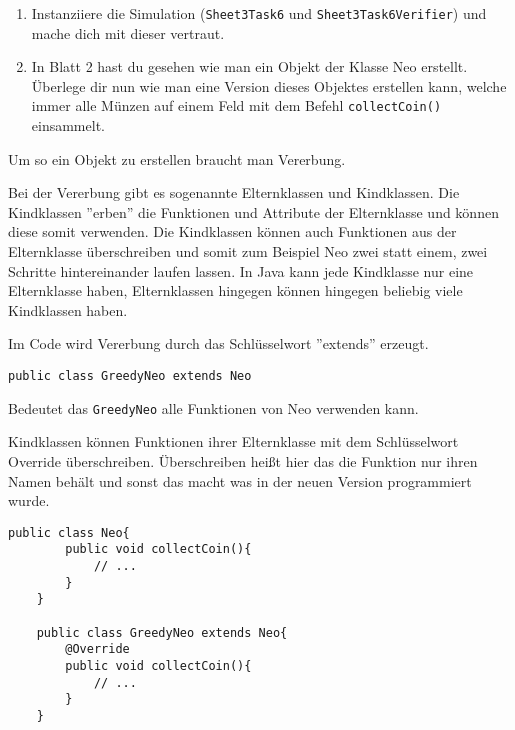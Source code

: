 \begin{enumerate}
	\item
	Instanziiere die Simulation (\lstinline{Sheet3Task6} und  \lstinline{Sheet3Task6Verifier}) und mache dich mit dieser vertraut.

\item In Blatt 2 hast du gesehen wie man ein Objekt der Klasse Neo erstellt. Überlege dir nun wie man eine Version dieses Objektes erstellen kann, welche immer alle Münzen auf einem Feld mit dem Befehl \lstinline{collectCoin()} einsammelt.
\end{enumerate}
Um so ein Objekt zu erstellen braucht man Vererbung.

\begin{Infobox}[Vererbung]


Bei der Vererbung gibt es sogenannte Elternklassen und Kindklassen. Die Kindklassen ''erben'' die Funktionen und Attribute der Elternklasse und können diese somit verwenden. Die Kindklassen können auch Funktionen aus der Elternklasse überschreiben und somit zum Beispiel Neo zwei statt einem, zwei Schritte hintereinander laufen lassen. In Java kann jede Kindklasse nur eine Elternklasse haben, Elternklassen hingegen können hingegen beliebig viele Kindklassen haben.

Im Code wird Vererbung durch das Schlüsselwort ''extends'' erzeugt.
\begin{lstlisting}[xleftmargin=0.5cm]
	public class GreedyNeo extends Neo
		\end{lstlisting}
 Bedeutet das \lstinline{GreedyNeo} alle Funktionen von Neo verwenden kann.

 Kindklassen können Funktionen ihrer Elternklasse mit dem Schlüsselwort Override überschreiben. Überschreiben heißt hier das die Funktion nur ihren Namen behält und sonst das macht was in der neuen Version programmiert wurde.
 \begin{lstlisting}[xleftmargin=0.5cm]
	public class Neo{
		public void collectCoin(){
			// ...
		}
	}

	public class GreedyNeo extends Neo{
		@Override
		public void collectCoin(){
			// ...
		}
	}
		\end{lstlisting}
\end{Infobox}


